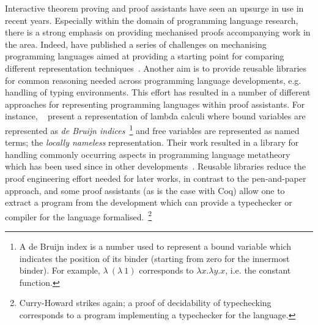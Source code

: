 \documentclass{mprop}
\begin{document}
Interactive theorem proving and proof assistants have seen an upsurge in use in recent years. Especially within the domain of programming language research, there is a strong emphasis on providing mechanised proofs accompanying work in the area. Indeed, \citeauthor{Aydemir:2005:MMM} have published a series of challenges on mechanising programming languages aimed at providing a starting point for comparing different representation techniques~\cite{Aydemir:2005:MMM}. Another aim is to provide reusable libraries for common reasoning needed across programming language developments, e.g. handling of typing environments. This effort has resulted in a number of different approaches for representing programming languages within proof assistants. For instance, \citeauthor{Aydemir:2008:EFM}~\cite{Aydemir:2008:EFM} present a representation of lambda calculi where bound variables are represented as \textit{de Bruijn indices}~\footnote{A de Bruijn index is a number used to represent a bound variable which indicates the position of its binder (starting from zero for the innermost binder). For example, $\lambda~(\lambda~1)$ corresponds to $\lambda x. \lambda y. x$, i.e. the constant function.} and free variables are represented as named terms; the \textit{locally nameless} representation. Their work resulted in a library for handling commonly occurring aspects in programming language metatheory which has been used since in other developments~\cite{Park:2014:MMW}. Reusable libraries reduce the proof engineering effort needed for later works, in contrast to the pen-and-paper approach, and some proof assistants (as is the case with Coq) allow one to extract a program from the development which can provide a typechecker or compiler for the language formalised.~\footnote{Curry-Howard strikes again; a proof of decidability of typechecking corresponds to a program implementing a typechecker for the language.}
\end{document}
